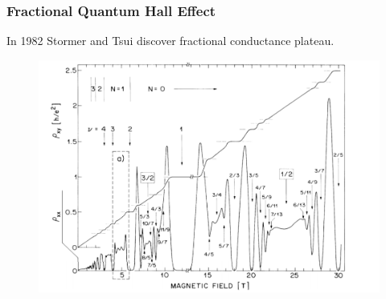 \documentclass{beamer}
\begin{document}
\begin{frame}
\frametitle{Fractional Quantum Hall Effect}
\begin{center}

In 1982 Stormer and Tsui discover fractional conductance plateau.

\begin{figure}[!htb]
\centering
\includegraphics[scale=0.25]{fractional.png}
\end{figure}

\end{center}
\end{frame}
\end{document}
